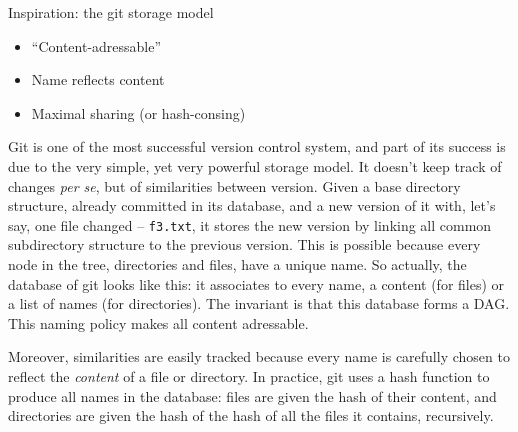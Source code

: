 \documentclass[ignorenonframetext,red]{beamer}
\begin{document}
\begin{frame}{Inspiration: the \textsf{git} storage model}
\begin{center}
\begin{overlayarea}{\textwidth}{12em}
    \end{overlayarea}
  \end{center}%
  \begin{itemize}\small %
  \item<7-> ``Content-adressable''%
  \item<8-> Name reflects content%
  \item<9-> Maximal sharing (or hash-consing)%
  \end{itemize}%
\end{frame}

\textsf{Git} is one of the most successful version control system, and
part of its success is due to the very simple, yet very powerful
storage model. It doesn't keep track of changes \emph{per se}, but of
similarities between version. Given a base directory structure,
already committed in its database, and a new version of it with, let's
say, one file changed -- \texttt{f3.txt}, it stores the new version by
linking all common subdirectory structure to the previous version.
This is possible because every node in the tree, directories and
files, have a unique name. So actually, the database of \textsf{git}
looks like this: it associates to every name, a content (for files) or
a list of names (for directories). The invariant is that this database
forms a DAG. This naming policy makes all content adressable.

Moreover, similarities are easily tracked because every name is
carefully chosen to reflect the \emph{content} of a file or directory.
In practice, \textsf{git} uses a hash function to produce all names in
the database: files are given the hash of their content, and
directories are given the hash of the hash of all the files it
contains, recursively.
\end{document}
